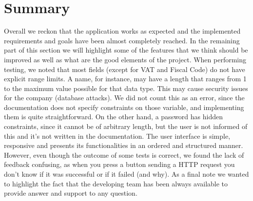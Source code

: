 \documentclass[titlepage]{article}
\begin{document}
\pagebreak
\section{Summary}
Overall we reckon that the application works as expected and the implemented requirements and goals have been almost completely reached. In the remaining part of this section we will highlight some of the features that we think should be improved as well as what are the good elements of the project.
\newline
\newline
\noindent
When performing testing, we noted that most fields (except for VAT and Fiscal Code) do not have explicit range limits. A name, for instance, may have a length that ranges from 1 to the maximum value possible for that data type. This may cause security issues for the company (database attacks). \newline
We did not count this as an error, since the documentation does not specify constraints on those variable, and implementing them is quite straightforward. \newline
On the other hand, a password has hidden constraints, since it cannot be of arbitrary length, but the user is not informed of this and it's not written in the documentation.
\newline
\newline
\noindent
The user interface is simple, responsive and presents its functionalities in an ordered and structured manner. 
However, even though  the  outcome of some tests is  correct,  we  found  the  lack  of  feedback  confusing, as when you press a button sending a HTTP request you don't know if it was successful or if it failed (and why).
\newline
\newline
\noindent
As a final note we wanted to highlight the fact that the developing team has been always available to provide answer and support to any question.
\end{document}
